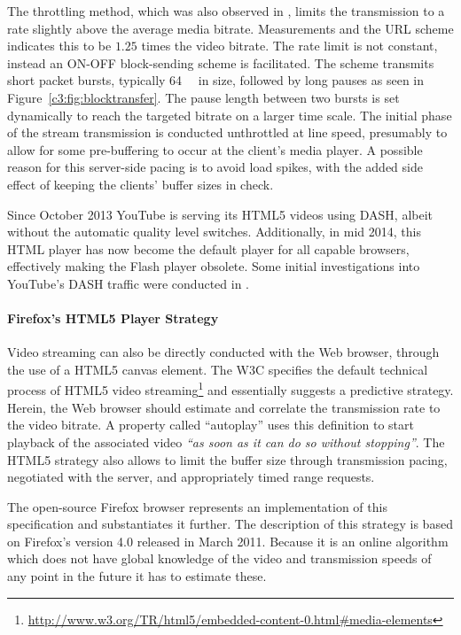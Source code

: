 The throttling method, which was also observed in \cite{alcock2011afcyt}, limits the transmission to a rate slightly above the average media bitrate. Measurements and the \gls{URL} scheme indicates this to be $1.25$ times the video bitrate. The rate limit is not constant, instead an ON-OFF block-sending scheme is facilitated. The scheme transmits short packet bursts, typically \SI{64}{\kibi\byte} in size, followed by long pauses as seen in Figure~\ref{c3:fig:blocktransfer}. The pause length between two bursts is set dynamically to reach the targeted bitrate on a larger time scale. The initial phase of the stream transmission is conducted unthrottled at line speed, presumably to allow for some pre-buffering to occur at the client's media player. A possible reason for this server-side pacing is to avoid load spikes, with the added side effect of keeping the clients' buffer sizes in check.

Since October 2013 YouTube is serving its \acrshort{HTML}5 videos using \gls{DASH}, albeit without the automatic quality level switches. Additionally, in mid 2014, this \acrshort{HTML} player has now become the default player for all capable browsers, effectively making the Flash player obsolete. Some initial investigations into YouTube's \gls{DASH} traffic were conducted in \cite{2014arXiv1408.5777A}.


\paragraph{Firefox's HTML5 Player Strategy}

Video streaming can also be directly conducted with the Web browser, through the use of a \acrshort{HTML}5 canvas element. The \gls{W3C} specifies the default technical process of \acrshort{HTML}5 video streaming\footnote{\url{http://www.w3.org/TR/html5/embedded-content-0.html\#media-elements}} and essentially suggests a predictive strategy. Herein, the Web browser should estimate and correlate the transmission rate to the video bitrate. A property called ``autoplay'' uses this definition to start playback of the associated video \textit{\enquote{as soon as it can do so without stopping}}. The \acrshort{HTML}5 strategy also allows to limit the buffer size through transmission pacing, negotiated with the server, and appropriately timed range requests.

The open-source Firefox browser represents an implementation of this specification and substantiates it further. The description of this strategy is based on Firefox's version 4.0 released in March 2011. Because it is an online algorithm which does not have global knowledge of the video and transmission speeds of any point in the future it has to estimate these.


